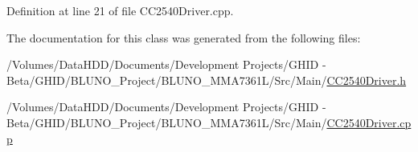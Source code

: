 \-Definition at line 21 of file \-C\-C2540\-Driver.\-cpp.



\-The documentation for this class was generated from the following files\-:\begin{DoxyCompactItemize}
\item 
/\-Volumes/\-Data\-H\-D\-D/\-Documents/\-Development Projects/\-G\-H\-I\-D -\/ Beta/\-G\-H\-I\-D/\-B\-L\-U\-N\-O\-\_\-\-Project/\-B\-L\-U\-N\-O\-\_\-\-M\-M\-A7361\-L/\-Src/\-Main/\hyperlink{_c_c2540_driver_8h}{\-C\-C2540\-Driver.\-h}\item 
/\-Volumes/\-Data\-H\-D\-D/\-Documents/\-Development Projects/\-G\-H\-I\-D -\/ Beta/\-G\-H\-I\-D/\-B\-L\-U\-N\-O\-\_\-\-Project/\-B\-L\-U\-N\-O\-\_\-\-M\-M\-A7361\-L/\-Src/\-Main/\hyperlink{_c_c2540_driver_8cpp}{\-C\-C2540\-Driver.\-cpp}\end{DoxyCompactItemize}
